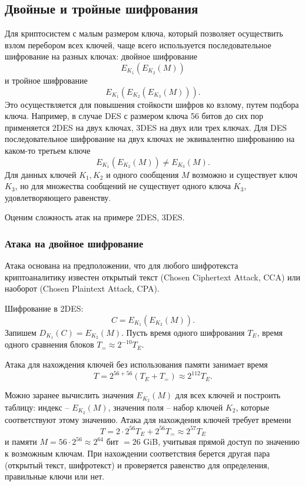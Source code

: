 \subsection{Двойные и тройные шифрования}

Для криптосистем с малым размером ключа, который позволяет осуществить взлом перебором всех ключей, чаще всего используется последовательное шифрование на разных ключах: двойное шифрование
    \[ E_{K_1}( E_{K_2}( M)) \]
и тройное шифрование
    \[ E_{K_1}( E_{K_2}( E_{K_3} (M))). \]
Это осуществляется для повышения стойкости шифров ко взлому, путем подбора ключа.
Например, в случае DES с размером ключа 56 битов до сих пор применяется 2DES на двух ключах, 3DES на двух или трех ключах. Для DES последовательное шифрование на двух ключах не эквивалентно шифрованию на каком-то третьем ключе
    \[ E_{K_1}( E_{K_2} (M)) \neq E_{K_3}(M). \]
Для данных ключей $K_1, K_2$ и одного сообщения $M$ возможно и существует ключ $K_3$, но для множества сообщений не существует одного ключа $K_3$, удовлетворяющего равенству.

Оценим сложность атак на примере 2DES, 3DES.


\subsubsection{Атака на двойное шифрование}


Атака основана на предположении, что для любого шифротекста криптоаналитику известен открытый текст (Chosen Ciphertext Attack, CCA) или наоборот (Chosen Plaintext Attack, CPA).

Шифрование в 2DES:
    \[ C = E_{K_1}( E_{K_2}(M)). \]
Запишем $D_{K_1}(C) = E_{K_2}(M)$. Пусть время одного шифрования $T_E$, время одного сравнения блоков $T_{=} \approx 2^{-10} T_E$.

Атака для нахождения ключей без использования памяти занимает время
    \[ T = 2^{56 + 56} (T_E + T_{=}) \approx 2^{112} T_E. \]

Можно заранее вычислить значения $E_{K_2}(M)$ для всех ключей и построить таблицу: индекс -- $E_{K_2}(M)$, значения поля -- набор ключей $K_2$, которые соответствуют этому значению. Атака для нахождения ключей требует времени
    \[ T = 2 \cdot 2^{56} T_E + 2^{56} T_{=} \approx 2^{57} T_E \]
и памяти $M = 56 \cdot 2^{56} \approx 2^{64}$ бит $= 26$ GiB, учитывая прямой доступ по значению к возможным ключам. При нахождении соответствия берется другая пара (открытый текст, шифротекст) и проверяется равенство для определения, правильные ключи или нет.

